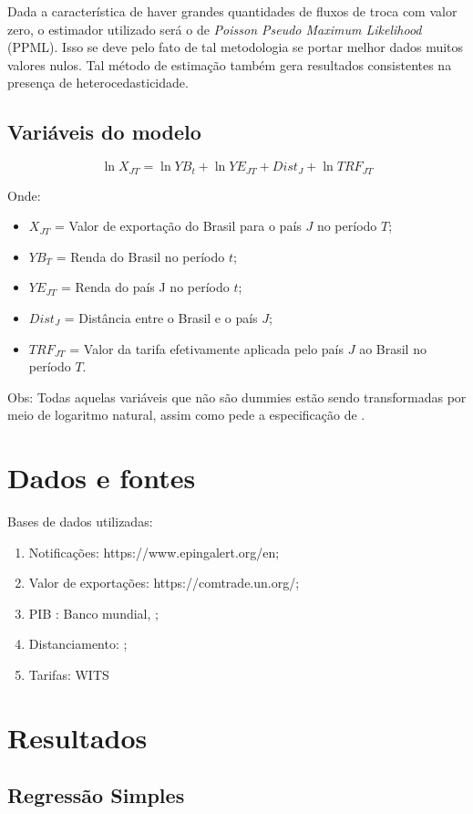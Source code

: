 \documentclass[12pt, a4paper]{article}
\begin{document}
Dada a característica de haver grandes quantidades de fluxos de troca com valor zero, o estimador utilizado será o de \emph{Poisson Pseudo Maximum Likelihood} (PPML). Isso se deve pelo fato de tal metodologia se portar melhor dados muitos valores nulos. Tal método de estimação também gera resultados consistentes na presença de heterocedasticidade. 

\subsection{Variáveis do modelo}

\begin{equation}
    \ln X_{JT} = \ln YB_t + \ln YE_{JT} + Dist_J + \ln TRF_{JT} 
\end{equation}

Onde:

\begin{itemize}
    \item $X_{JT}$ = Valor de exportação do Brasil para o país $J$ no período $T$;
    \item $YB_T$ = Renda do Brasil no período $t$;
    \item $YE_{JT}$ = Renda do país J no período $t$;
    \item $Dist_J$ = Distância entre o Brasil e o país $J$;
    \item $TRF_{JT}$ = Valor da tarifa efetivamente aplicada pelo país $J$ ao Brasil no período $T$.
\end{itemize}

Obs: Todas aquelas variáveis que não são dummies estão sendo transformadas por meio de logaritmo natural, assim como pede a especificação de \cite{Log_Of_Gravity}.


\section{Dados e fontes}

Bases de dados utilizadas:

\begin{enumerate}
    \item Notificações: https://www.epingalert.org/en;
    \item Valor de exportações: https://comtrade.un.org/;
    \item PIB : Banco mundial, \cite{WB};
    \item Distanciamento: \cite{CEPII};
    \item Tarifas: WITS
\end{enumerate}

\section{Resultados}

\subsection{Regressão Simples}


\printbibliography
\end{document}
